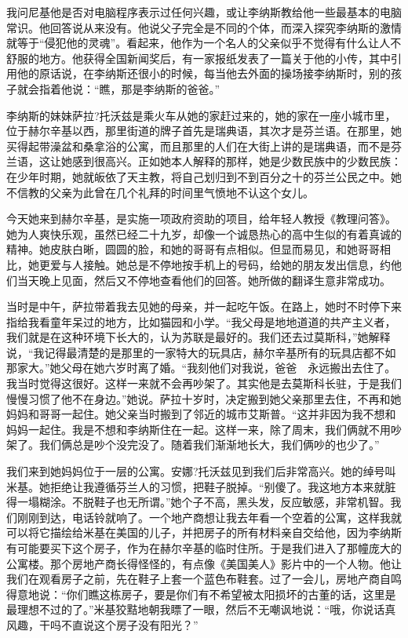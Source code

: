 我问尼基他是否对电脑程序表示过任何兴趣，或让李纳斯教给他一些最基本的电脑常识。他回答说从来没有。他说父子完全是不同的个体，而深入探究李纳斯的激情就等于“侵犯他的灵魂”。看起来，他作为一个名人的父亲似乎不觉得有什么让人不舒服的地方。他获得全国新闻奖后，有一家报纸发表了一篇关于他的小传，其中引用他的原话说，在李纳斯还很小的时候，每当他去外面的操场接李纳斯时，别的孩子就会指着他说：“瞧，那是李纳斯的爸爸。”

李纳斯的妹妹萨拉?托沃兹是乘火车从她的家赶过来的，她的家在一座小城市里，位于赫尔辛基以西，那里街道的牌子首先是瑞典语，其次才是芬兰语。在那里，她买得起带澡盆和桑拿浴的公寓，而且那里的人们在大街上讲的是瑞典语，而不是芬兰语，这让她感到很高兴。正如她本人解释的那样，她是少数民族中的少数民族：在少年时期，她就皈依了天主教，将自己划归到不到百分之十的芬兰公民之中。她不信教的父亲为此曾在几个礼拜的时间里气愤地不认这个女儿。

今天她来到赫尔辛基，是实施一项政府资助的项目，给年轻人教授《教理问答》。她为人爽快乐观，虽然已经二十九岁，却像一个诚恳热心的高中生似的有着真诚的精神。她皮肤白晰，圆圆的脸，和她的哥哥有点相似。但显而易见，和她哥哥相比，她更爱与人接触。她总是不停地按手机上的号码，给她的朋友发出信息，约他们当天晚上见面，然后又不停地查看他们的回答。她所做的翻译生意非常成功。

当时是中午，萨拉带着我去见她的母亲，并一起吃午饭。在路上，她时不时停下来指给我看童年呆过的地方，比如猫园和小学。“我父母是地地道道的共产主义者，我们就是在这种环境下长大的，认为苏联是最好的。我们还去过莫斯科，”她解释说，“我记得最清楚的是那里的一家特大的玩具店，赫尔辛基所有的玩具店都不如那家大。”她父母在她六岁时离了婚。“我刻他们对我说，爸爸　永远搬出去住了。我当时觉得这很好。这样一来就不会再吵架了。其实他是去莫斯科长驻，于是我们慢慢习惯了他不在身边。”她说。萨拉十岁时，决定搬到她父亲那里去住，不再和她妈妈和哥哥一起住。她父亲当时搬到了邻近的城市艾斯普。“这并非因为我不想和妈妈一起住。我是不想和李纳斯住在一起。这样一来，除了周末，我们俩就不用吵架了。我们俩总是吵个没完没了。随着我们渐渐地长大，我们俩吵的也少了。”

我们来到她妈妈位于一层的公寓。安娜?托沃兹见到我们后非常高兴。她的绰号叫米基。她拒绝让我遵循芬兰人的习惯，把鞋子脱掉。“别傻了。我这地方本来就脏得一塌糊涂。不脱鞋子也无所谓。”她个子不高，黑头发，反应敏感，非常机智。我们刚刚到达，电话铃就响了。一个地产商想让我去年看一个空着的公寓，这样我就可以将它描绘给米基在美国的儿子，并把房子的所有材料亲自交给他，因为李纳斯有可能要买下这个房子，作为在赫尔辛基的临时住所。于是我们进入了那幢庞大的公寓楼。那个房地产商长得怪怪的，有点像《美国美人》影片中的一个人物。他让我们在观看房子之前，先在鞋子上套一个蓝色布鞋套。过了一会儿，房地产商自鸣得意地说：“你们瞧这栋房子，要是你们有不希望被太阳损坏的古董的话，这里是最理想不过的了。”米基狡黠地朝我瞟了一眼，然后不无嘲讽地说：“哦，你说话真风趣，干吗不直说这个房子没有阳光？”


